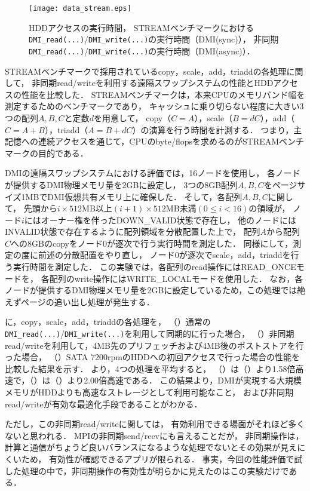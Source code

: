\documentclass[10pt]{jsarticle}
\begin{document}
\begin{figure}
  \centering
  \texttt{[image: data\_stream.eps]}
  \caption{HDDアクセスの実行時間，
    STREAMベンチマークにおける\texttt{DMI\_read(...)}/\texttt{DMI\_write(...)}の実行時間（DMI(sync)），
    非同期\texttt{DMI\_read(...)}/\texttt{DMI\_write(...)}の実行時間（DMI(async)）．}
  \label{fig:data_stream}
\end{figure}

STREAMベンチマークで採用されているcopy，scale，add，triaddの各処理に関して，
非同期read/writeを利用する遠隔スワップシステムの性能とHDDアクセスの性能を比較した．
STREAMベンチマークは，本来CPUのメモリバンド幅を測定するためのベンチマークであり，
キャッシュに乗り切らない程度に大きい3つの配列$A,B,C$と定数$d$を用意して，
copy（$C=A$），scale（$B=dC$），add（$C=A+B$），triadd（$A=B+dC$）の演算を行う時間を計測する．
つまり，主記憶への連続アクセスを通じて，CPUのbyte/flopsを求めるのがSTREAMベンチマークの目的である．

DMIの遠隔スワップシステムにおける評価では，16ノードを使用し，
各ノードが提供するDMI物理メモリ量を2GBに設定し，
3つの8GB配列$A,B,C$をページサイズ1MBでDMI仮想共有メモリ上に確保した．
そして，各配列$A,B,C$に関して，
先頭から$i\times512\mathrm{MB}$以上$(i+1)\times512\mathrm{MB}$未満$(0\le i<16)$の領域が，
ノード$i$にはオーナー権を伴ったDOWN\_VALID状態で存在し，
他のノードにはINVALID状態で存在するように配列領域を分散配置した上で，
配列$A$から配列$C$への8GBのcopyをノード0が逐次で行う実行時間を測定した．
同様にして，測定の度に前述の分散配置をやり直し，
ノード0が逐次でscale，add，triaddを行う実行時間を測定した．
この実験では，各配列のread操作にはREAD\_ONCEモードを，
各配列のwrite操作にはWRITE\_LOCALモードを使用した．
なお，各ノードが提供するDMI物理メモリ量を2GBに設定しているため，この処理では絶えずページの追い出し処理が発生する．

に，copy，scale，add，triaddの各処理を，
（\I）通常の\texttt{DMI\_read(...)}/\texttt{DMI\_write(...)}を利用して同期的に行った場合，
（\II）非同期read/writeを利用して，4MB先のプリフェッチおよび4MB後のポストストアを行った場合，
（\III）SATA 7200rpmのHDDへの初回アクセスで行った場合の性能を比較した結果を示す．
より，4つの処理を平均すると，
（\I）は（\III）より1.58倍高速で，（\II）は（\III）より2.00倍高速である．
この結果より，DMIが実現する大規模メモリがHDDよりも高速なストレージとして利用可能なこと，
および非同期read/writeが有効な最適化手段であることがわかる．

ただし，この非同期read/writeに関しては，
有効利用できる場面がそれほど多くないと思われる．
MPIの非同期send/recvにも言えることだが，
非同期操作は，計算と通信がちょうど良いバランスになるような処理でないとその効果が見えにくいため，
有効性が確認できるアプリが限られる．
事実，今回の性能評価で試した処理の中で，非同期操作の有効性が明らかに見えたのはこの実験だけである．
\end{document}
